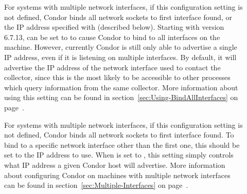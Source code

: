 \begin{description}

\item[] \label{param:BindAllInterfaces}
  For systems with multiple network interfaces, if this configuration
  setting is not defined, Condor binds all network sockets to first
  interface found, or the IP address specified with
   (described below).
  Starting with version 6.7.13,  can be
  set to  to cause Condor to bind to all interfaces on the
  machine.
  However, currently Condor is still only able to advertise a single
  IP address, even if it is listening on multiple interfaces.  By
  default, it will advertise the IP address of the network interface
  used to contact the collector, since this is the most likely to be
  accessible to other processes which query information from the same
  collector.
  More information about using this setting can be found in
  section~\ref{sec:Using-BindAllInterfaces} on
  page~\pageref{sec:Using-BindAllInterfaces}. 

\item[] \label{param:NetworkInterface}
  For systems with multiple network interfaces, if this configuration
  setting is not defined, Condor binds all network sockets to first
  interface found.
  To bind to a specific network interface other than the
  first one, this  should be set to 
  the IP address to use.
  When  is set to , this
  setting simply controls what IP address a given Condor host will
  advertise.
  More information about configuring Condor on machines with multiple
  network interfaces can be found in
  section~\ref{sec:Multiple-Interfaces} on
  page~\pageref{sec:Multiple-Interfaces}.


\end{description}
